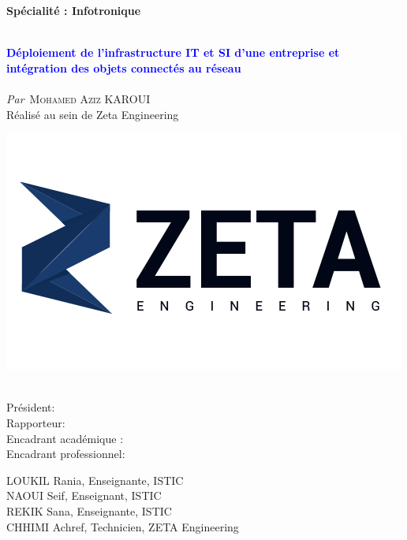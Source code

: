 \begin{titlepage}

\textbf{Spécialité : Infotronique }

\vskip1cm%


\HRule \\[0.4cm]
\textcolor{blue}{ \LARGE \bfseries Déploiement de l'infrastructure IT et SI d'une entreprise et intégration des objets connectés au réseau}\\[0.3cm] %
\HRule \\[1cm]


\textit{Par}\
\textsc{\large Mohamed Aziz KAROUI}\\[0.5cm] %


{Réalisé au sein de Zeta Engineering}\\
\smallskip

\includegraphics[width=0.4\columnwidth]{Images/logo-zeta.png}\

 


 \begin{center}

\begin{minipage}[c]{0.3\columnwidth}
Président:\\
Rapporteur:\\
Encadrant académique :\\
Encadrant professionnel:
\end{minipage}
\begin{minipage}[c]{0.6\columnwidth}
LOUKIL Rania, Enseignante, ISTIC\\
NAOUI Seif, Enseignant, ISTIC\\
REKIK Sana, Enseignante, ISTIC\\
CHHIMI Achref, Technicien, ZETA Engineering
\end{minipage}



\end{center}
\end{titlepage}
